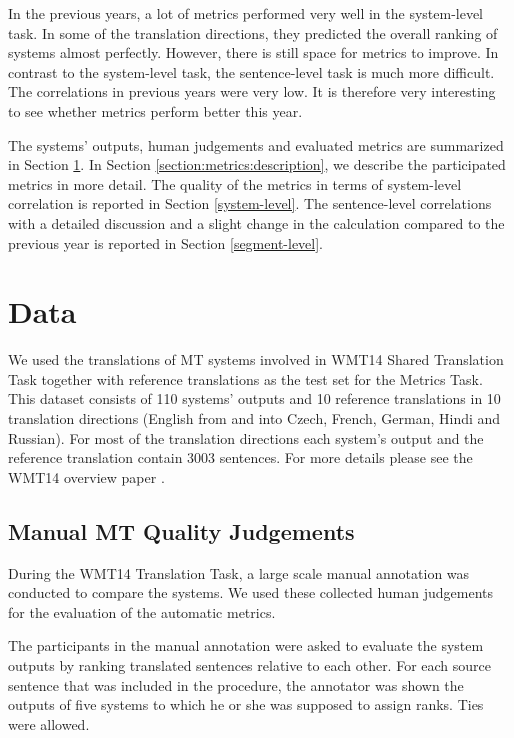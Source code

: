 In the previous years, a lot of metrics performed very well in the system-level
task. In some of the translation directions, they predicted the overall ranking
of systems almost perfectly. However, there is still space for metrics to
improve.  In contrast to the system-level task, the sentence-level task is much
more difficult. The correlations in previous years were very low. It is
therefore very interesting to see whether metrics perform better this year.

The systems' outputs, human judgements and evaluated metrics are summarized in
Section \ref{section:data}. In Section \ref{section:metrics:description}, we
describe the participated metrics in more detail. The quality of the metrics in
terms of system-level correlation is reported in Section \ref{system-level}.
The sentence-level correlations with a detailed discussion and a slight change in
the calculation compared to the previous year is reported in Section
\ref{segment-level}.

\section{Data}
\label{section:data}

We used the translations of MT systems involved in WMT14 Shared Translation
Task together with reference translations as the test set for the Metrics Task.
This dataset consists of 110 systems' outputs and 10 reference translations in
10 translation directions (English from and into Czech, French, German, Hindi
and Russian). For most of
the translation directions each system's output and the reference translation
contain 3003 sentences. For more details please see the WMT14 overview
paper . 

\subsection{Manual MT Quality Judgements}

During the WMT14 Translation Task, a large scale manual annotation was
conducted to compare the systems. We used these collected human judgements for
the evaluation of the automatic metrics. 

The participants in the manual annotation were asked to evaluate the system outputs
by ranking translated sentences relative to each other. For each source sentence
that was included in the procedure, the annotator was shown the outputs of five
systems to which he or she was supposed to assign ranks. Ties were allowed.

